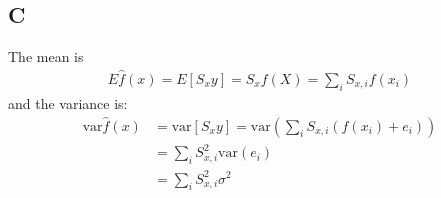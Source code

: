 \documentclass{article}
\begin{document}
\subsection*{C}
The mean is
\begin{align*}
E \hat{f}(x) = E [ S_x y ] = S_x f(X) = \sum_i S_{x,i} f(x_i)
\end{align*}
and the variance is:
\begin{align*}
\mbox{var} \hat{f}(x) &= \mbox{var} [ S_x y ] = \mbox{var} \left( \sum_i S_{x,i} (f(x_i) + e_i) \right)\\
&= \sum_i S_{x,i}^2 \mbox{var}(e_i)\\
&= \sum_i S_{x,i}^2 \sigma^2\\
\end{align*}
\end{document}
